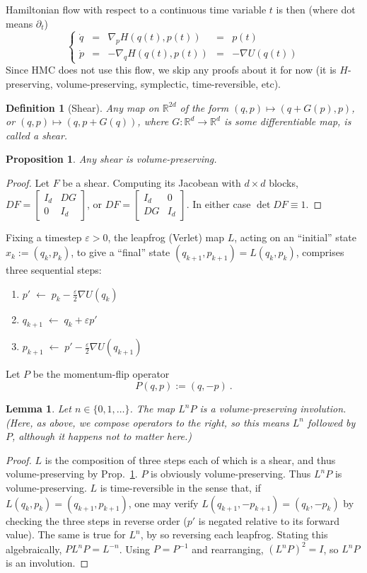 \documentclass[10pt]{article}
\newcommand{\ben}{\begin{enumerate}}
\newcommand{\een}{\end{enumerate}}
\newcommand{\be}{\begin{equation}}
\newcommand{\ee}{\end{equation}}
\newcommand{\R}{\mathbb{R}}
\newtheorem{lem}[thm]{Lemma}
\newtheorem{pro}[thm]{Proposition}
\newtheorem{dfn}[thm]{Definition}
\newcommand{\eps}{\varepsilon}
\begin{document}
Hamiltonian flow with respect to a continuous time variable $t$ is then
(where dot means $\partial_t$)
\be
\left\{\begin{array}{lllll}\dot q &=& \nabla_p H(q(t),p(t)) &=& p(t) \\
\dot p &=& -\nabla_q H(q(t),p(t)) &=& -\nabla U(q(t))
\end{array}\right.
\label{flow}
\ee
Since HMC does not use this flow, we skip any proofs about it for now
(it is $H$-preserving, volume-preserving, symplectic, time-reversible, etc).

\begin{dfn}[Shear]
  Any map on $\R^{2d}$ of the form
  $(q,p) \mapsto (q + G(p),p)$, or
  $(q,p) \mapsto (q, p +G(q))$,
  where $G:\R^d\to \R^d$ is some differentiable map, is called a {\em shear}.
\end{dfn}
\begin{pro}
  Any shear is volume-preserving.
  \label{p:shear}
\end{pro}
\begin{proof}
  Let $F$ be a shear.
  Computing its Jacobean with $d\times d$ blocks,
  $DF = \left[\begin{smallmatrix}I_d&DG\\0 &I_d \end{smallmatrix}\right]$, or
    $DF = \left[\begin{smallmatrix}I_d &0\\DG &I_d \end{smallmatrix}\right]$.
  In either case $\det DF \equiv 1$.
\end{proof}


Fixing a timestep $\eps>0$, the leapfrog (Verlet) map $L$,
acting on an ``initial'' state $x_k:=(q_k,p_k)$,
to give a ``final'' state $(q_{k+1},p_{k+1}) = L(q_k,p_k)$,
comprises three sequential steps:
\ben
\item $p'     \;\leftarrow\; p_k - \frac{\eps}{2} \nabla U(q_k)$
\item $q_{k+1} \;\leftarrow\; q_k + \eps p'$
\item $p_{k+1} \;\leftarrow\; p' - \frac{\eps}{2} \nabla U(q_{k+1})$
\een
Let $P$ be the momentum-flip operator
$$
P(q,p) := (q,-p)~.
$$
\begin{lem}
  Let $n\in\{0,1,\dots\}$.
  The map $L^n P$ is a volume-preserving involution.
  (Here, as above, we compose operators to the right, so this
  means $L^n$ followed by $P$, although it happens not to
  matter here.)
  \label{l:LnP}
\end{lem}
\begin{proof}
  $L$ is the composition of three steps each of which is a shear, and thus
  volume-preserving by Prop.~\ref{p:shear}. $P$ is obviously volume-preserving.
  Thus $L^nP$ is volume-preserving.
  $L$ is time-reversible in the sense that, if $L(q_k,p_k)=(q_{k+1},p_{k+1})$,
  one may verify $L(q_{k+1},-p_{k+1})=(q_k,-p_k)$ by
  checking the three steps in reverse order ($p'$ is negated relative
  to its forward value).
  The same is true for $L^n$, by so reversing each leapfrog.
  Stating this algebraically, $PL^n P = L^{-n}$. Using $P=P^{-1}$ and
  rearranging, $(L^nP)^2 = I$, so $L^n P$ is an involution.
\end{proof}
\end{document}
